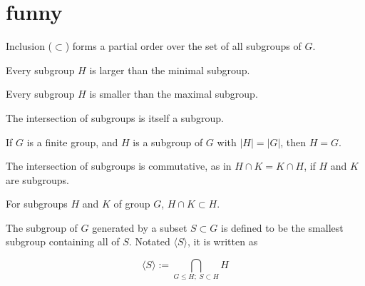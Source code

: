 \section{funny}

\begin{theorem}
    \label{theorem : PartialOrder (Subgroup G)}
    Inclusion ($\subset$) forms a partial order over the set of all subgroups of $G$.
\end{theorem}

\begin{theorem}
    \label{theorem : Minimal_smallest}
    \leanok
    Every subgroup $H$ is larger than the minimal subgroup.
\end{theorem}

\begin{theorem}
    \label{theorem : Maximal_largest}
    \leanok
    Every subgroup $H$ is smaller than the maximal subgroup.
\end{theorem}

\begin{theorem}
    \label{definition : Intersect}
    \leanok
    The intersection of subgroups is itself a subgroup.
\end{theorem}

\begin{theorem}
    \label{definition : subgroup_eq_maximal_of_card_eq_g}
    If $G$ is a finite group, and $H$ is a subgroup of $G$ with $|H| = |G|$, then $H = G$.
\end{theorem}

\begin{theorem}
    \label{theorem : inter_comm}
    The intersection of subgroups is commutative, as in $H \cap K = K \cap H$, if $H$ and $K$ are subgroups.
\end{theorem}

\begin{theorem}
    \label{theorem : le_intersect_self}
    For subgroups $H$ and $K$ of group $G$, $H \cap K \subset H$.
\end{theorem}

\begin{definition}
    \label{definition : Generate}
    \leanok
    The subgroup of $G$ generated by a subset $S \subset G$ is defined to be the smallest subgroup containing all of $S$. Notated $\langle S \rangle$, it is written as

    \begin{equation*}
        \langle S \rangle := \bigcap_{G \le H;\; S \subset H} H
    \end{equation*}
\end{definition}

